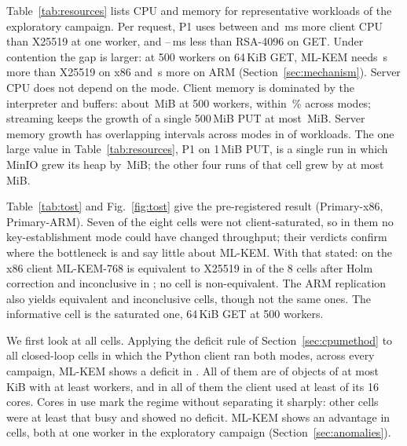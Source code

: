 \documentclass[conference]{IEEEtran}
\newcommand{\lab}[1]{\textsf{#1}}
\begin{document}
Table~\ref{tab:resources} lists CPU and memory for representative workloads of the exploratory
campaign. Per request, P1 uses between \HfourBtwoMin{} and \HfourBtwoMax\,ms more client CPU than
X25519 at one worker, and \HfourRoneGetMin--\HfourRoneGetMax\,ms less than RSA-4096 on GET.
Under contention the gap is larger: at 500 workers on 64\,KiB GET, ML-KEM needs
\RevHotCpuDelta\,\textmu s more than X25519 on x86 and \ArmHotCpuDelta\,\textmu s more on ARM
(Section~\ref{sec:mechanism}). Server CPU does not depend on the mode. Client memory is
dominated by the interpreter and buffers: about \MemPeakSmallSat\,MiB at 500 workers, within \MemModeSpreadPct\,\% across modes;
streaming keeps the growth of a single 500\,MiB PUT at most \MemGrowthLargeOne\,MiB. Server
memory growth has overlapping intervals across modes in \ServerGrowthOverlap{} of
\ServerGrowthWorkloads{} workloads. The one large value in Table~\ref{tab:resources}, P1 on
1\,MiB PUT, is a single run in which MinIO grew its heap by \ServerGrowthOneRun\,MiB; the other
four runs of that cell grew by at most \ServerGrowthOtherRuns\,MiB.

\begin{table}[t]
\caption{Exploratory campaign: CPU (\% of the host's 16 vCPU, measured window), client CPU time per request and memory (peak RSS and growth over the run), mean of five runs}
\label{tab:resources}
\centering\footnotesize

\end{table}

Table~\ref{tab:tost} and Fig.~\ref{fig:tost} give the pre-registered result
(\lab{Primary-x86}, \lab{Primary-ARM}). Seven of the eight cells were not client-saturated, so in
them no key-establishment mode could have changed throughput; their verdicts confirm where the
bottleneck is and say little about ML-KEM. With that stated: on the x86 client ML-KEM-768 is
equivalent to X25519 in \RevPrimaryEq{} of the 8 cells after Holm correction and inconclusive
in \RevPrimaryInc; no cell is non-equivalent. The ARM replication also yields \ArmPrimaryEq{}
equivalent and \ArmPrimaryInc{} inconclusive cells, though not the same ones. The informative
cell is the saturated one, 64\,KiB GET at 500 workers.

We first look at all cells. Applying the deficit rule of Section~\ref{sec:cpumethod} to all
\AudSweepCells{} closed-loop cells in which the Python client ran both modes, across every
campaign, ML-KEM shows a deficit in \AudSweepDeficits. All of them are
\AudSweepDeficitOps{} of objects of at most \AudSweepDeficitMaxSizeKiB\,KiB with at least
\AudSweepDeficitMinWorkers{} workers, and in all of them the client used at least
\AudSweepDeficitMinCores{} of its 16 cores. Cores in use mark the regime without separating it
sharply: \AudSweepBusyNoDeficit{} other cells were at least that busy and showed no deficit.
ML-KEM shows an advantage in \AudSweepAdvantages{} cells, both \AudSweepAdvantageOps{} at one
worker in the exploratory campaign (Section~\ref{sec:anomalies}).
\end{document}
